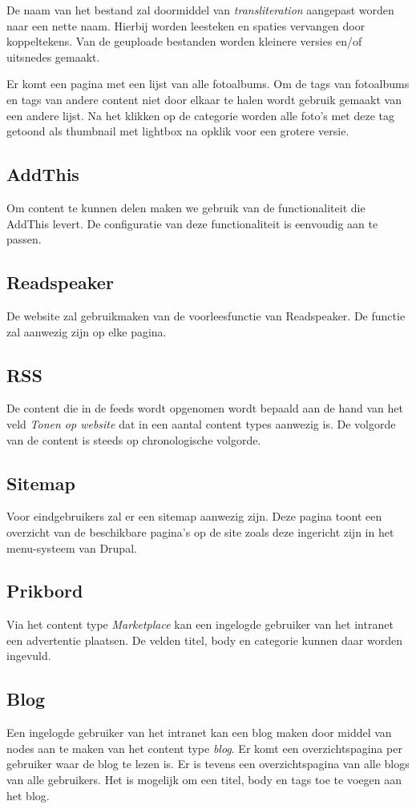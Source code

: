 De naam van het bestand zal doormiddel van \emph{transliteration} aangepast worden naar een nette naam. Hierbij worden leesteken en spaties vervangen door koppeltekens. Van de geuploade bestanden worden kleinere versies en/of uitsnedes gemaakt.

Er komt een pagina met een lijst van alle fotoalbums. Om de tags van fotoalbums en tags van andere content niet door elkaar te halen wordt gebruik gemaakt van een andere lijst. Na het klikken op de categorie worden alle foto's met deze tag getoond als thumbnail met lightbox na opklik voor een grotere versie.

\subsection{AddThis}
Om content te kunnen delen maken we gebruik van de functionaliteit die AddThis levert. De configuratie van deze functionaliteit is eenvoudig aan te passen.

\subsection{Readspeaker}
De website zal gebruikmaken van de voorleesfunctie van Readspeaker. De functie zal aanwezig zijn op elke pagina.

\subsection{RSS}
De content die in de feeds wordt opgenomen wordt bepaald aan de hand van het veld \emph{Tonen op website} dat in een aantal content types aanwezig is. De volgorde van de content is steeds op chronologische volgorde.

\subsection{Sitemap}
Voor eindgebruikers zal er een sitemap aanwezig zijn. Deze pagina toont een overzicht van de beschikbare pagina's op de site zoals deze ingericht zijn in het menu-systeem van Drupal.

\subsection{Prikbord}
Via het content type \emph{Marketplace} kan een ingelogde gebruiker van het intranet een advertentie plaatsen. De velden titel, body en categorie kunnen daar worden ingevuld. 

\subsection{Blog}
Een ingelogde gebruiker van het intranet kan een blog maken door middel van nodes aan te maken van het content type \emph{blog}. Er komt een overzichtspagina per gebruiker waar de blog te lezen is. Er is tevens een overzichtspagina van alle blogs van alle gebruikers. Het is mogelijk om een titel, body en tags toe te voegen aan het blog.

